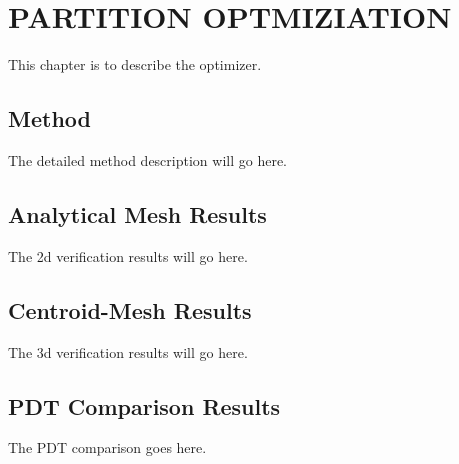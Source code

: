 %
%
%
%



\chapter{PARTITION OPTMIZIATION \label{cha:optimization}}

This chapter is to describe the optimizer.

\section{Method}
The detailed method description will go here.

\section{Analytical Mesh Results}
The 2d verification results will go here.

\section{Centroid-Mesh Results}

The 3d verification results will go here.

\section{PDT Comparison Results}

The PDT comparison goes here.